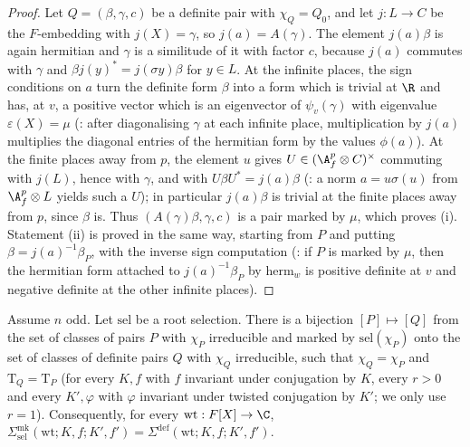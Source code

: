 \begin{proof}
Let $Q=(\beta,\gamma,c)$ be a definite pair with $\chi_Q=Q_0$, and let $j:L\to C$ be the $F$-embedding with $j(X)=\gamma$, so
$j(a)=A(\gamma)$. The element $j(a)\beta$ is again hermitian and $\gamma$ is a similitude of it with factor $c$, because $j(a)$ commutes with $\gamma$
and $\beta j(y)^*=j(\sigma y)\beta$ for $y\in L$. At the infinite places, the sign conditions on $a$ turn the definite form $\beta$ into a form
which is trivial at $\R$ and has, at $v$, a positive vector which is an eigenvector of $\psi_v(\gamma)$ with eigenvalue $\varepsilon(X)=\mu$
(: after diagonalising $\gamma$ at each infinite place, multiplication by $j(a)$ multiplies the
diagonal entries of the hermitian form by the values $\phi(a)$). At the finite places away from $p$, the element $u$ gives
$U\in(\ksoneAfp\otimes C)^\times$ commuting with $j(L)$, hence with $\gamma$, and with $U\beta U^*=j(a)\beta$
(: a norm $a=u\sigma(u)$ from $\ksoneAfp\otimes L$ yields such a
$U$); in particular $j(a)\beta$ is trivial at the finite places away from $p$, since $\beta$ is. Thus $(A(\gamma)\beta,\gamma,c)$ is a pair marked by
$\mu$, which proves (i). Statement (ii) is proved in the same way, starting from $P$ and putting $\beta=j(a)^{-1}\beta_P$, with the inverse sign computation
(: if $P$ is marked by $\mu$, then the hermitian form attached to $j(a)^{-1}\beta_P$ by
$\mathrm{herm}_w$ is positive definite at $v$ and negative definite at the other infinite places).
\end{proof}

\begin{proposition}\label{pf:ks1:prop-move}
Assume $n$ odd. Let $\mathrm{sel}$ be a root selection. There is a bijection $[P]\mapsto[Q]$ from the set of classes of pairs $P$
with $\chi_P$ irreducible and marked by $\mathrm{sel}(\chi_P)$ onto the set of classes of definite pairs $Q$ with $\chi_Q$ irreducible,
such that $\chi_Q=\chi_P$ and $\mathrm T_Q=\mathrm T_P$ (for every $K,f$ with $f$ invariant under conjugation by $K$, every $r>0$ and every
$K',\varphi$ with $\varphi$ invariant under twisted conjugation by $K'$; we only use $r=1$). Consequently, for every
$\mathrm{wt}:F[X]\to\C$, $\Sigma^{\mathrm{mk}}_{\mathrm{sel}}(\mathrm{wt};K,f;K',f')=\Sigma^{\mathrm{def}}(\mathrm{wt};K,f;K',f')$.
\end{proposition}

